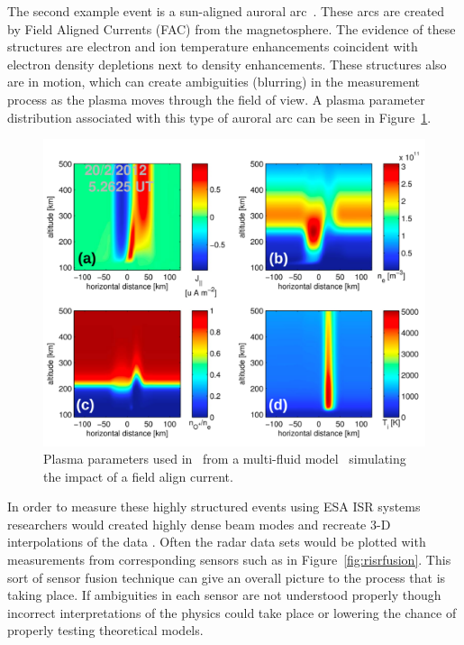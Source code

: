 The second example event is a sun-aligned auroral arc~\citep{Perry:2015jf}. These arcs are created by Field Aligned Currents (FAC) from the magnetosphere. The evidence of these structures are electron and ion temperature enhancements coincident with electron density depletions next to density enhancements. These structures also are in motion, which can create ambiguities (blurring) in the measurement process as the plasma moves through the field of view. A plasma parameter distribution associated with this type of auroral arc can be seen in Figure~\ref{fig:mzsim}.
\begin{figure}[!t]
\centering
\includegraphics[width=5.0in]{MZsim}
\caption{Plasma parameters used in~\citet{Perry:2015jf} from a multi-fluid model~\citep{semeter:plasmatransport2012} simulating the impact of a field align current. }
\label{fig:mzsim}
\end{figure}


In order to measure these highly structured events using ESA ISR systems researchers would created highly dense beam modes and recreate 3-D interpolations of the data \citep{Dahlgren:2012dq,dahlgren2012di}. Often the radar data sets would be plotted with measurements from corresponding sensors such as in Figure~\ref{fig:risrfusion}. This sort of sensor fusion technique can give an overall picture to the process that is taking place. If ambiguities in each sensor are not understood properly though incorrect interpretations of the physics could take place or lowering the chance of properly testing theoretical models. 

